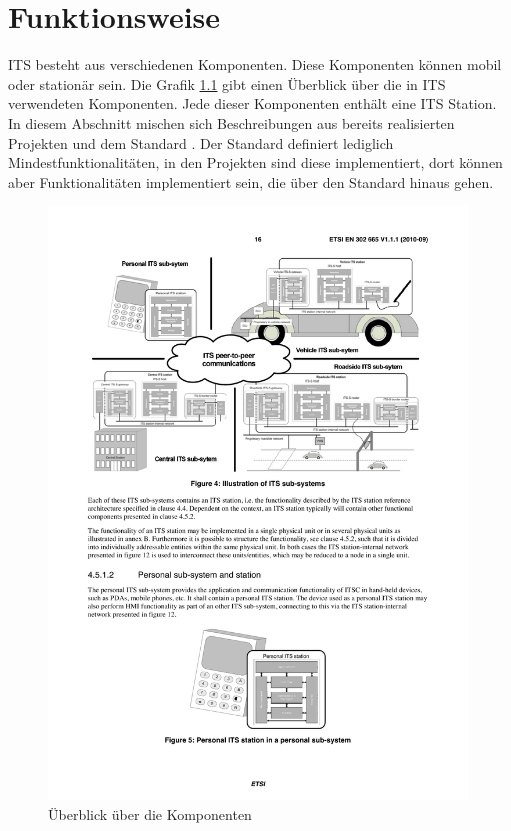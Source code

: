 \chapter{Funktionsweise \label{chap_funktionsweise}}
\ac{ITS} besteht aus verschiedenen Komponenten. Diese Komponenten können mobil oder stationär sein. Die Grafik \ref{fig:funktionsweise_komponentenueberblick} gibt einen Überblick über die in \ac{ITS} verwendeten Komponenten. Jede dieser Komponenten enthält eine \ac{ITS} Station. In diesem Abschnitt mischen sich Beschreibungen aus bereits realisierten Projekten und dem Standard \cite{etsi2010302}. Der Standard definiert lediglich Mindestfunktionalitäten, in den Projekten sind diese implementiert, dort können aber Funktionalitäten implementiert sein, die über den Standard hinaus gehen.

\begin{figure}
\includegraphics[width=0.99\textwidth]{content/images/01_funktionsweise/ueberblick-ITS-subsystems.pdf}
\caption{Überblick über die Komponenten \cite{etsi2010302}}
\label{fig:funktionsweise_komponentenueberblick}
\end{figure}


